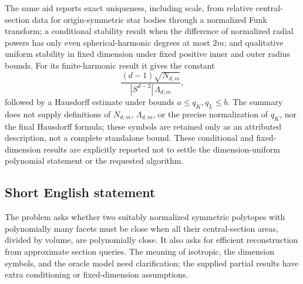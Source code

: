 \documentclass[11pt]{article}
\begin{document}
The same aid reports exact uniqueness, including scale, from relative central-section data for origin-symmetric star bodies through a normalized Funk transform; a conditional stability result when the difference of normalized radial powers has only even spherical-harmonic degrees at most $2m$; and qualitative uniform stability in fixed dimension under fixed positive inner and outer radius bounds. For its finite-harmonic result it gives the constant
\[
 \frac{(d-1)\sqrt{N_{d,m}}}{|S^{d-2}|\,\Lambda_{d,m}},
\]
followed by a Hausdorff estimate under bounds $a\leq q_K,q_L\leq b$. The summary does not supply definitions of $N_{d,m}$, $\Lambda_{d,m}$, or the precise normalization of $q_K$, nor the final Hausdorff formula; these symbols are retained only as an attributed description, not a complete standalone bound. These conditional and fixed-dimension results are explicitly reported not to settle the dimension-uniform polynomial statement or the requested algorithm.
\subsection{Short English statement}
The problem asks whether two suitably normalized symmetric polytopes with polynomially many facets must be close when all their central-section areas, divided by volume, are polynomially close. It also asks for efficient reconstruction from approximate section queries. The meaning of isotropic, the dimension symbols, and the oracle model need clarification; the supplied partial results have extra conditioning or fixed-dimension assumptions.
\end{document}
